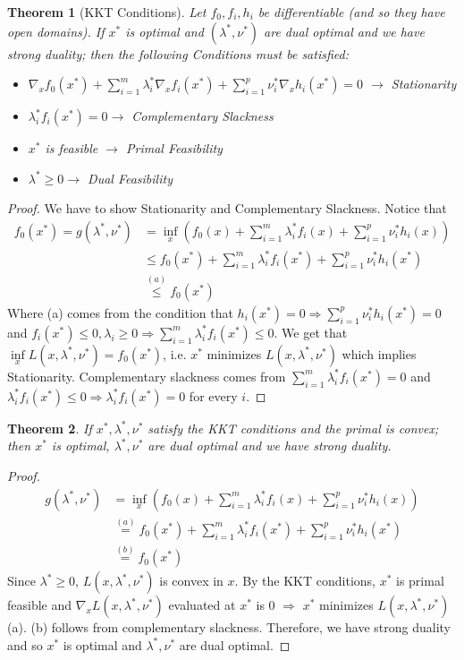 \documentclass[]{article}
\theoremstyle{mattstyle}
\newtheorem{theorem}{Theorem}[section]
\theoremstyle{definition}
\begin{document}
\begin{theorem}[KKT Conditions]
	Let $f_0, f_i, h_i$ be differentiable (and so they have open domains). If $x^*$ is optimal and $(\lambda^*, \nu^*)$ are dual optimal and we have strong duality; then the following Conditions must be satisfied:
	\begin{itemize}
		\item $\nabla_x f_0(x^*) + \sum_{i=1}^m \lambda_i^* \nabla_x f_i(x^*) + \sum_{i=1}^p \nu_i^* \nabla_x h_i(x^*) = 0$ $\rightarrow$ Stationarity
		\item $\lambda_i^* f_i(x^*)=0 \rightarrow$ Complementary Slackness
		\item $x^*$ is feasible $\rightarrow$ Primal Feasibility
		\item $\lambda^* \ge 0 \rightarrow$ Dual Feasibility
	\end{itemize}
\end{theorem}
\begin{proof}
	We have to show Stationarity and Complementary Slackness. Notice that
	\begin{align}
	f_{0}(x^*) = g(\lambda^*, \nu^*) &= \inf_x \left( f_0(x) + \sum_{i=1}^m \lambda_i^*f_i(x) + \sum_{i=1}^p \nu_i^* h_i(x) \right) \\
	&\le f_0(x^*) + \sum_{i=1}^m \lambda_i^*f_i(x^*) + \sum_{i=1}^p \nu_i^* h_i(x^*)\\
	&\overset{(a)}{\le} f_0(x^*)
	\end{align}
	Where (a) comes from the condition that $h_i(x^*) = 0 \Rightarrow \sum_{i=1}^p \nu_i^* h_i(x^*) = 0$ and $f_i(x^*) \le 0, \lambda_i \ge 0 \Rightarrow \sum_{i=1}^m \lambda_i^* f_i(x^*) \le 0$. We get that $\inf\limits_{x} L(x, \lambda^*, \nu^*) = f_0(x^*)$, i.e. $x^*$ minimizes $L(x, \lambda^*, \nu^*)$ which implies Stationarity. Complementary slackness comes from $\sum_{i=1}^m \lambda_i^* f_i(x^*) = 0$ and $\lambda_i^* f_i(x^*) \le 0 \Rightarrow \lambda_i^* f_i(x^*) = 0$ for every $i$.
\end{proof}

\begin{theorem}
	If $x^*, \lambda^*, \nu^*$ satisfy the KKT conditions and the primal is convex; then $x^*$ is optimal, $\lambda^*, \nu^*$ are dual optimal and we have strong duality.
\end{theorem}
\begin{proof}
	\begin{align}
	g(\lambda^*, \nu^*) &= \inf_x \left( f_0(x) + \sum_{i=1}^m \lambda_i^*f_i(x) + \sum_{i=1}^p \nu_i^* h_i(x) \right) \\
	&\overset{(a)}{=}f_0(x^*) + \sum_{i=1}^m \lambda_i^*f_i(x^*) + \sum_{i=1}^p \nu_i^* h_i(x^*)\\
	&\overset{(b)}{=}f_0(x^*)
	\end{align}
	Since $\lambda^*\ge0$, $L(x,\lambda^*,\nu^*)$ is convex in $x$. By the KKT conditions, $x^*$ is primal feasible and $\nabla_x L(x,\lambda^*,\nu^*)$ evaluated at $x^*$ is 0 $\Rightarrow$ $x^*$ minimizes $L(x,\lambda^*,\nu^*)$ (a). (b) follows from complementary slackness. Therefore, we have strong duality and so $x^*$ is optimal and $\lambda^*, \nu^*$ are dual optimal.
\end{proof}
\end{document}

